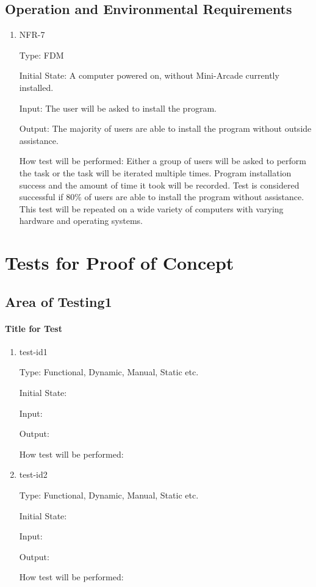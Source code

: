 \documentclass[12pt, titlepage]{article}
\begin{document}
\subsection{Operation and Environmental Requirements}
\begin{enumerate}
\item{NFR-7\\}

Type: FDM
					
Initial State: A computer powered on, without Mini-Arcade currently installed.
					
Input: The user will be asked to install the program.

Output: The majority of users are able to install the program without outside assistance.

How test will be performed: Either a group of users will be asked to perform the task or the task will be iterated multiple times. Program installation success and the amount of time it took will be recorded. Test is considered successful if 80\% of users are able to install the program without assistance. This test will be repeated on a wide variety of computers with varying hardware and operating systems.
\end{enumerate}

\section{Tests for Proof of Concept}

\subsection{Area of Testing1}
		
\paragraph{Title for Test}

\begin{enumerate}

\item{test-id1\\}

Type: Functional, Dynamic, Manual, Static etc.
					
Initial State: 
					
Input: 
					
Output: 
					
How test will be performed: 
					
\item{test-id2\\}

Type: Functional, Dynamic, Manual, Static etc.
					
Initial State: 
					
Input: 
					
Output: 
					
How test will be performed: 

\end{enumerate}
\end{document}
